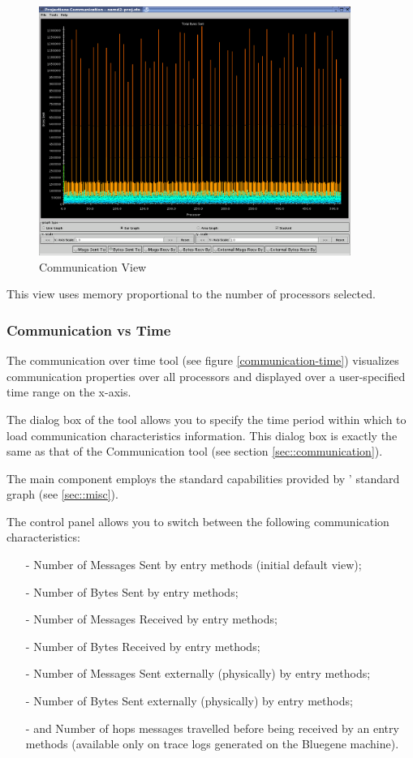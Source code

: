 \documentclass[10pt]{article}
\begin{document}
\begin{figure}[htb]
\center
\includegraphics[width=4.0in]{fig/apoa1_512_CommProcessorProfile}
\caption{Communication View}
\label{communication}
\end{figure}

This view uses memory proportional to the number of processors selected.

\subsubsection{Communication vs Time}

The communication over time tool (see figure \ref{communication-time})
visualizes communication properties over all processors and displayed
over a user-specified time range on the x-axis.

The dialog box of the tool allows you to specify the time period
within which to load communication characteristics information. This
dialog box is exactly the same as that of the Communication tool (see
section \ref{sec::communication}).

The main component employs the standard capabilities provided by
\projections{}' standard graph (see \ref{sec::misc}).

The control panel allows you to switch between the following
communication characteristics:

\begin{itemize}
\item[-] Number of Messages Sent by entry methods (initial default view);
\item[-] Number of Bytes Sent by entry methods;
\item[-] Number of Messages Received by entry methods;
\item[-] Number of Bytes Received by entry methods;
\item[-] Number of Messages Sent externally (physically) by entry methods;
\item[-] Number of Bytes Sent externally (physically) by entry methods;
\item[-] and Number of hops messages travelled before being received
by an entry methods (available only on trace logs generated on the
Bluegene machine).
\end{itemize}
\end{document}
